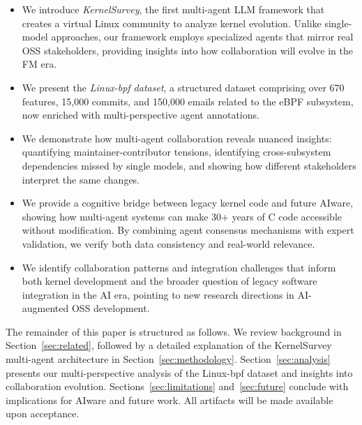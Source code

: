 \documentclass[sigconf,review,anonymous]{acmart}
\begin{document}
\begin{itemize}
    \item We introduce \emph{KernelSurvey}, the first multi-agent LLM framework that creates a virtual Linux community to analyze kernel evolution. Unlike single-model approaches, our framework employs specialized agents that mirror real OSS stakeholders, providing insights into how collaboration will evolve in the FM era.
    \item We present the \textit{Linux-bpf dataset}, a structured dataset comprising over 670 features, 15,000 commits, and 150,000 emails related to the eBPF subsystem, now enriched with multi-perspective agent annotations.
    \item We demonstrate how multi-agent collaboration reveals nuanced insights: quantifying maintainer-contributor tensions, identifying cross-subsystem dependencies missed by single models, and showing how different stakeholders interpret the same changes.
    \item We provide a cognitive bridge between legacy kernel code and future AIware, showing how multi-agent systems can make 30+ years of C code accessible without modification. By combining agent consensus mechanisms with expert validation, we verify both data consistency and real-world relevance.
    \item We identify collaboration patterns and integration challenges that inform both kernel development and the broader question of legacy software integration in the AI era, pointing to new research directions in AI-augmented OSS development.
\end{itemize}

The remainder of this paper is structured as follows. We review background in Section~\ref{sec:related}, followed by a detailed explanation of the KernelSurvey multi-agent architecture in Section~\ref{sec:methodology}. Section~\ref{sec:analysis} presents our multi-perspective analysis of the Linux-bpf dataset and insights into collaboration evolution. Sections~\ref{sec:limitations} and~\ref{sec:future} conclude with implications for AIware and future work. All artifacts will be made available upon acceptance.
\end{document}
